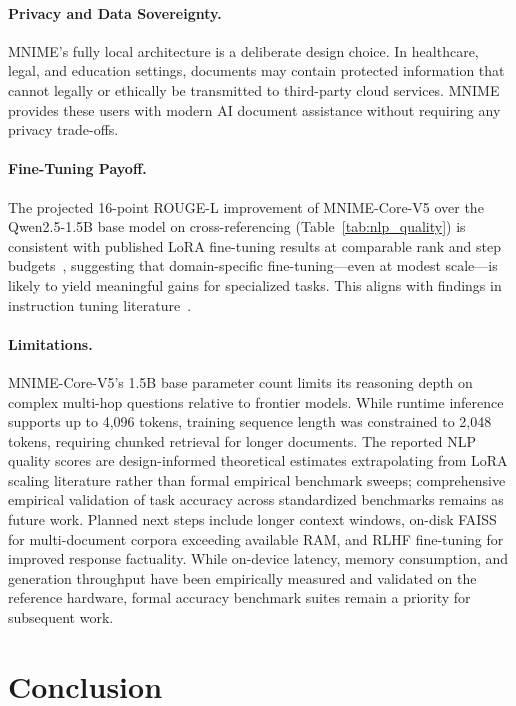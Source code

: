 \documentclass[11pt]{article}
\begin{document}
\paragraph{Privacy and Data Sovereignty.}
MNIME's fully local architecture is a deliberate design choice.
In healthcare, legal, and education settings, documents may contain protected
information that cannot legally or ethically be transmitted to third-party
cloud services.
MNIME provides these users with modern AI document assistance without
requiring any privacy trade-offs.

\paragraph{Fine-Tuning Payoff.}
The projected 16-point ROUGE-L improvement of MNIME-Core-V5 over the
Qwen2.5-1.5B base model on cross-referencing (Table~\ref{tab:nlp_quality})
is consistent with published LoRA fine-tuning results at comparable
rank and step budgets~\cite{hu2021lora}, suggesting that
domain-specific fine-tuning---even at modest scale---is likely to
yield meaningful gains for specialized tasks.
This aligns with findings in instruction tuning
literature~\cite{wei2022flan,ouyang2022instructgpt}.

\paragraph{Limitations.}
MNIME-Core-V5's 1.5B base parameter count limits its reasoning depth on complex
multi-hop questions relative to frontier models.
While runtime inference supports up to 4,096 tokens, training sequence length
was constrained to 2,048 tokens, requiring chunked retrieval for longer documents.
The reported NLP quality scores are design-informed theoretical estimates
extrapolating from LoRA scaling literature rather than formal empirical benchmark sweeps;
comprehensive empirical validation of task accuracy across standardized benchmarks
remains as future work.
Planned next steps include longer context windows, on-disk FAISS for
multi-document corpora exceeding available RAM, and RLHF fine-tuning for
improved response factuality. While on-device latency, memory consumption, and
generation throughput have been empirically measured and validated on the reference hardware,
formal accuracy benchmark suites remain a priority for subsequent work.

\section{Conclusion}
\label{sec:conclusion}
\end{document}
